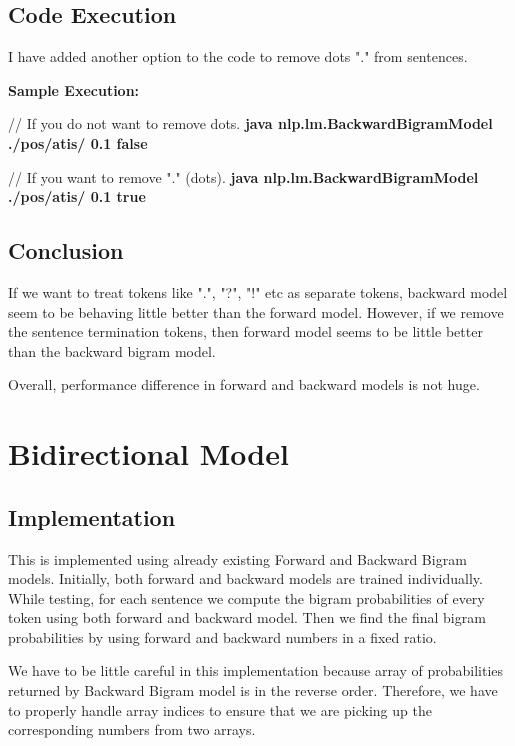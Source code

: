 \subsection{Code Execution}

I have added another option to the code to remove dots "." from sentences. 

{\bfseries Sample Execution:}

// If you do not want to remove dots.
\newline
{\bfseries java nlp.lm.BackwardBigramModel ./pos/atis/ 0.1 false}


// If you want to remove "." (dots).
\newline
{\bfseries java nlp.lm.BackwardBigramModel ./pos/atis/ 0.1 true}

\subsection{Conclusion}

If we want to treat tokens like ".", "?", "!" etc as separate tokens, backward model seem to be behaving little better than the forward model. However, if we remove the sentence termination tokens, then forward model seems to be little better than the backward bigram model.

Overall, performance difference in forward and backward models is not huge.

\section {Bidirectional Model}

\subsection {Implementation}

This is implemented using already existing Forward and Backward Bigram models. Initially, both forward and backward models are trained individually. While testing, for each sentence we compute the bigram probabilities of every token using both forward and backward model. Then we find the final bigram probabilities by using forward and backward numbers in a fixed ratio.

We have to be little careful in this implementation because array of probabilities returned by Backward Bigram model is in the reverse order. Therefore, we have to properly handle array indices to ensure that we are picking up the corresponding numbers from two arrays.

